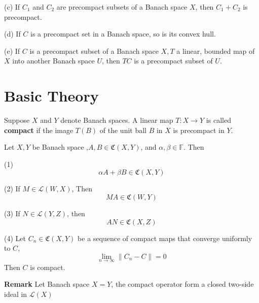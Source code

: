 \documentclass[12pt, oneside]{book}
\begin{document}
\begin{proposition}
    (c) If $C_1$ and $C_2$ are precompact subsets of a Banach space $X$, then $C_1+C_2$ is precompact.


    (d) If $C$ is a precompact set in a Banach space, so is its convex hull.

    (e) If $C$ is a precompact subset of a Banach space $X, T$ a linear, bounded map of $X$ into another Banach space $U$, then $T C$ is a precompact subset of $U$.

\end{proposition}




\section{Basic Theory}
\begin{definition}
    Suppose $X$ and $Y$ denote Banach spaces. A linear map $T: X \rightarrow Y$ is called \textbf{compact} if the image $ T\left(B\right)$ of the unit ball $B$ in $X$ is precompact in $Y$.
\end{definition}

\begin{theorem}
    Let $X,Y$ be Banach space ,$A,B \in \mathfrak{C}(X,Y)$, and $\alpha,\beta\in \mathbb{F}$. Then

    (1)
    \begin{equation*}
        \alpha A+ \beta B\in \mathfrak{C}(X,Y)
    \end{equation*}

    (2) If $M\in \mathcal{L}(W,X)$, Then
    \begin{equation*}
        MA\in \mathfrak{C}(W,Y)
    \end{equation*}

    (3) If $N\in \mathcal{L}(Y,Z)$, then
    \begin{equation*}
        AN\in \mathfrak{C}(X,Z)
    \end{equation*}

    (4) Let $C_n\in \mathfrak{C}(X,Y)$ be a sequence of compact maps that converge uniformly to $C$,
    \begin{equation*}
        \lim_{n\to \infty} \left\|C_n-C\right\|=0
    \end{equation*}
    Then $C$ is compact.

    \textbf{Remark}  Let Banach space $X=Y$, the compact operator form a closed two-side ideal in $\mathcal{L}(X)$
\end{theorem}
\end{document}

